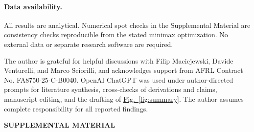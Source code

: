 \documentclass[10pt,aps,pra,twocolumn,superscriptaddress,nofootinbib,longbibliography]{revtex4-2}
\begin{document}
\paragraph*{Data availability.}
All results are analytical.  Numerical spot checks in the Supplemental Material are consistency checks reproducible from the stated minimax optimization.  No external data or separate research software are required.

\begin{acknowledgments}
The author is grateful for helpful discussions with Filip Maciejewski, Davide Venturelli, and Marco Sciorilli, and acknowledges support from AFRL Contract No. FA8750-25-C-B0040.  OpenAI ChatGPT was used under author-directed prompts for literature synthesis, cross-checks of derivations and claims, manuscript editing, and the drafting of \hyperref[fig:summary]{Fig.~\ref*{fig:summary}}.  The author assumes complete responsibility for all reported findings.
\end{acknowledgments}




\clearpage
\onecolumngrid
\setcounter{equation}{0}
\setcounter{section}{0}
\setcounter{subsection}{0}
\setcounter{proposition}{0}
\renewcommand{\theequation}{S\arabic{equation}}
\renewcommand{\thesection}{S\Roman{section}}
\renewcommand{\thesubsection}{\thesection.\Alph{subsection}}
\renewcommand{\theproposition}{S\arabic{proposition}}
\renewcommand{\theHequation}{supp.\arabic{equation}}
\renewcommand{\theHsection}{supp.\Roman{section}}
\renewcommand{\theHsubsection}{supp.\Roman{section}.\Alph{subsection}}
\renewcommand{\theHproposition}{supp.\arabic{proposition}}
\begin{center}
{\large\bfseries SUPPLEMENTAL MATERIAL}
\end{center}
\label{sec:supplemental}
\end{document}
